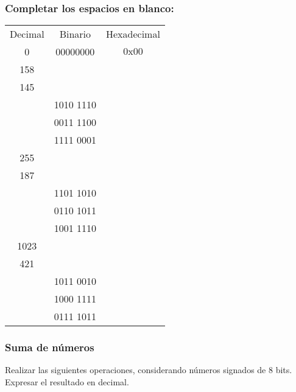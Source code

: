 \subsubsection{Completar los espacios en blanco:}
\begin{tabular}{ccc}
  Decimal&Binario&Hexadecimal\\
  0&00000000&$\mathrm{0x00}$ \\
  158& &\underspace\\
  145&\underspace &\underspace \\
  \underspace&1010 1110&\underspace \\
  \underspace&0011 1100&\underspace \\
  \underspace&1111 0001&\underspace \\
  255& &\underspace\\
  187&\underspace &\underspace \\
  \underspace&1101 1010&\underspace \\
  \underspace&0110 1011&\underspace \\
  \underspace&1001 1110&\underspace \\
  1023& &\underspace\\
  421&\underspace &\underspace \\
  \underspace&1011 0010&\underspace \\
  \underspace&1000 1111&\underspace \\
  \underspace&0111 1011&\underspace \\
\end{tabular}

\subsubsection{Suma de números}
Realizar las siguientes operaciones, considerando números signados de 8 bits. Expresar el resultado en decimal.
\vspace{10mm}

